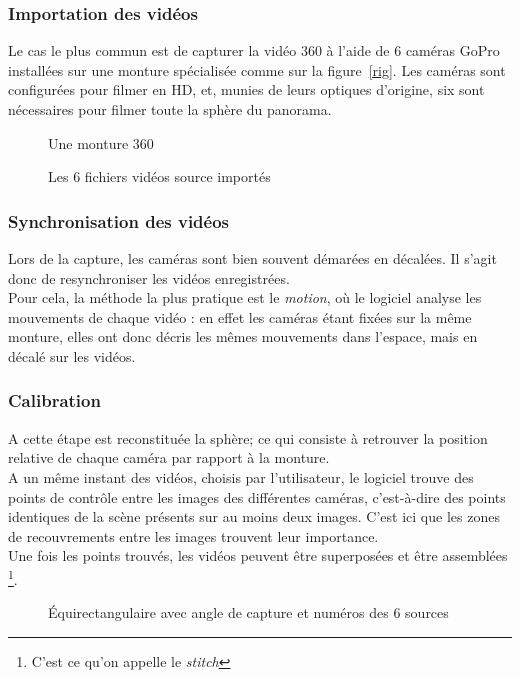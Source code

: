 \subsubsection{Importation des vidéos}
Le cas le plus commun est de capturer la vidéo 360 à l'aide de 6 caméras GoPro 
installées sur une monture spécialisée comme sur la figure~\ref{rig}. 
Les caméras sont configurées pour filmer en HD, et, munies de leurs optiques 
d'origine, six sont nécessaires pour filmer toute la sphère du panorama.
\begin{figure}
  \centering
  \begin{minipage}{0.4\textwidth}
    \centering
    \caption{Une monture 360}
    \label{rig}
  \end{minipage}%
  \begin{minipage}{0.6\textwidth}
    \centering
    \caption{Les 6 fichiers vidéos source importés}
    \label{importation}
  \end{minipage}
\end{figure}

\subsubsection{Synchronisation des vidéos}
Lors de la capture, les caméras sont bien souvent démarées en décalées. Il s'agit
donc de resynchroniser les vidéos enregistrées.\\
Pour cela, la méthode la plus pratique est le \textit{motion},
où le logiciel analyse les mouvements de chaque vidéo : en effet les caméras étant fixées
sur la même monture, elles ont donc décris les mêmes mouvements dans l'espace, mais 
en décalé sur les vidéos.

\subsubsection{Calibration}
A cette étape est reconstituée la sphère; ce qui consiste à retrouver la 
position relative de chaque caméra par rapport à la monture.\\
A un même instant des vidéos, choisis par l'utilisateur, le logiciel trouve des
points de contrôle entre les images des différentes caméras, c'est-à-dire des
points identiques de la scène présents sur au moins deux images. C'est ici que les 
zones de recouvrements entre les images trouvent leur importance.\\
Une fois les points trouvés, les vidéos peuvent être superposées et être assemblées
\footnote{C'est ce qu'on appelle le \textit{stitch}}.
\begin{figure}
  \centering
  \caption{Équirectangulaire avec angle de capture et numéros des 6 sources} 
\end{figure}

